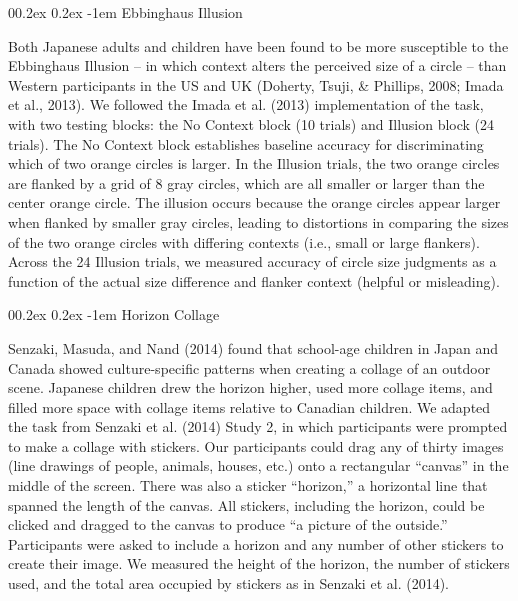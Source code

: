 \documentclass[
  man,floatsintext]{apa6}
\makeatletter
\let\oldparagraph\paragraph
\renewcommand{\paragraph}[1]{\oldparagraph{#1}\mbox{}}
\renewcommand{\paragraph}{\@startsection{paragraph}{4}{\parindent}%
  {0\baselineskip \@plus 0.2ex \@minus 0.2ex}%
  {-1em}%
  {\normalfont\normalsize\bfseries\itshape\typesectitle}}
\makeatother
\begin{document}
\hypertarget{ebbinghaus-illusion}{%
\paragraph{Ebbinghaus Illusion}\label{ebbinghaus-illusion}}

Both Japanese adults and children have been found to be more susceptible to the Ebbinghaus Illusion -- in which context alters the perceived size of a circle -- than Western participants in the US and UK (Doherty, Tsuji, \& Phillips, 2008; Imada et al., 2013). We followed the Imada et al. (2013) implementation of the task, with two testing blocks: the No Context block (10 trials) and Illusion block (24 trials). The No Context block establishes baseline accuracy for discriminating which of two orange circles is larger. In the Illusion trials, the two orange circles are flanked by a grid of 8 gray circles, which are all smaller or larger than the center orange circle. The illusion occurs because the orange circles appear larger when flanked by smaller gray circles, leading to distortions in comparing the sizes of the two orange circles with differing contexts (i.e., small or large flankers). Across the 24 Illusion trials, we measured accuracy of circle size judgments as a function of the actual size difference and flanker context (helpful or misleading).

\hypertarget{horizon-collage}{%
\paragraph{Horizon Collage}\label{horizon-collage}}

Senzaki, Masuda, and Nand (2014) found that school-age children in Japan and Canada showed culture-specific patterns when creating a collage of an outdoor scene. Japanese children drew the horizon higher, used more collage items, and filled more space with collage items relative to Canadian children. We adapted the task from Senzaki et al. (2014) Study 2, in which participants were prompted to make a collage with stickers. Our participants could drag any of thirty images (line drawings of people, animals, houses, etc.) onto a rectangular ``canvas'' in the middle of the screen. There was also a sticker ``horizon,'' a horizontal line that spanned the length of the canvas. All stickers, including the horizon, could be clicked and dragged to the canvas to produce ``a picture of the outside.'' Participants were asked to include a horizon and any number of other stickers to create their image. We measured the height of the horizon, the number of stickers used, and the total area occupied by stickers as in Senzaki et al. (2014).
\end{document}
